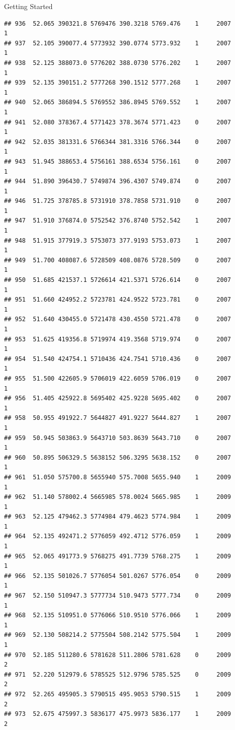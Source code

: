 \documentclass[
  ignorenonframetext,
]{beamer}
\begin{document}
\begin{frame}[fragile]{Getting Started}
\begin{verbatim}
## 936  52.065 390321.8 5769476 390.3218 5769.476    1     2007        1
## 937  52.105 390077.4 5773932 390.0774 5773.932    1     2007        1
## 938  52.125 388073.0 5776202 388.0730 5776.202    1     2007        1
## 939  52.135 390151.2 5777268 390.1512 5777.268    1     2007        1
## 940  52.065 386894.5 5769552 386.8945 5769.552    1     2007        1
## 941  52.080 378367.4 5771423 378.3674 5771.423    0     2007        1
## 942  52.035 381331.6 5766344 381.3316 5766.344    0     2007        1
## 943  51.945 388653.4 5756161 388.6534 5756.161    0     2007        1
## 944  51.890 396430.7 5749874 396.4307 5749.874    0     2007        1
## 946  51.725 378785.8 5731910 378.7858 5731.910    0     2007        1
## 947  51.910 376874.0 5752542 376.8740 5752.542    1     2007        1
## 948  51.915 377919.3 5753073 377.9193 5753.073    1     2007        1
## 949  51.700 408087.6 5728509 408.0876 5728.509    0     2007        1
## 950  51.685 421537.1 5726614 421.5371 5726.614    0     2007        1
## 951  51.660 424952.2 5723781 424.9522 5723.781    0     2007        1
## 952  51.640 430455.0 5721478 430.4550 5721.478    0     2007        1
## 953  51.625 419356.8 5719974 419.3568 5719.974    0     2007        1
## 954  51.540 424754.1 5710436 424.7541 5710.436    0     2007        1
## 955  51.500 422605.9 5706019 422.6059 5706.019    0     2007        1
## 956  51.405 425922.8 5695402 425.9228 5695.402    0     2007        1
## 958  50.955 491922.7 5644827 491.9227 5644.827    1     2007        1
## 959  50.945 503863.9 5643710 503.8639 5643.710    0     2007        1
## 960  50.895 506329.5 5638152 506.3295 5638.152    0     2007        1
## 961  51.050 575700.8 5655940 575.7008 5655.940    1     2009        1
## 962  51.140 578002.4 5665985 578.0024 5665.985    1     2009        1
## 963  52.125 479462.3 5774984 479.4623 5774.984    1     2009        1
## 964  52.135 492471.2 5776059 492.4712 5776.059    1     2009        1
## 965  52.065 491773.9 5768275 491.7739 5768.275    1     2009        1
## 966  52.135 501026.7 5776054 501.0267 5776.054    0     2009        1
## 967  52.150 510947.3 5777734 510.9473 5777.734    0     2009        1
## 968  52.135 510951.0 5776066 510.9510 5776.066    1     2009        1
## 969  52.130 508214.2 5775504 508.2142 5775.504    1     2009        1
## 970  52.185 511280.6 5781628 511.2806 5781.628    0     2009        2
## 971  52.220 512979.6 5785525 512.9796 5785.525    0     2009        2
## 972  52.265 495905.3 5790515 495.9053 5790.515    1     2009        2
## 973  52.675 475997.3 5836177 475.9973 5836.177    1     2009        2

\end{verbatim}
\end{frame}
\end{document}
